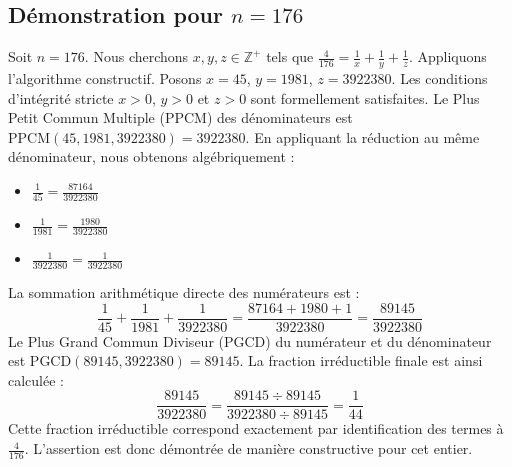 \documentclass[11pt,a4paper]{article}
\begin{document}
\subsection{Démonstration pour $n = 176$}
Soit $n = 176$. Nous cherchons $x, y, z \in \mathbb{Z}^{+}$ tels que $\frac{4}{176} = \frac{1}{x} + \frac{1}{y} + \frac{1}{z}$.
Appliquons l'algorithme constructif. Posons $x = 45$, $y = 1981$, $z = 3922380$.
Les conditions d'intégrité stricte $x > 0$, $y > 0$ et $z > 0$ sont formellement satisfaites.
Le Plus Petit Commun Multiple (PPCM) des dénominateurs est $\text{PPCM}(45, 1981, 3922380) = 3922380$.
En appliquant la réduction au même dénominateur, nous obtenons algébriquement :
\begin{itemize}
    \item $\frac{1}{45} = \frac{87164}{3922380}$
    \item $\frac{1}{1981} = \frac{1980}{3922380}$
    \item $\frac{1}{3922380} = \frac{1}{3922380}$
\end{itemize}
La sommation arithmétique directe des numérateurs est :
$$ \frac{1}{45} + \frac{1}{1981} + \frac{1}{3922380} = \frac{87164 + 1980 + 1}{3922380} = \frac{89145}{3922380} $$
Le Plus Grand Commun Diviseur (PGCD) du numérateur et du dénominateur est $\text{PGCD}(89145, 3922380) = 89145$.
La fraction irréductible finale est ainsi calculée :
$$ \frac{89145}{3922380} = \frac{89145 \div 89145}{3922380 \div 89145} = \frac{1}{44} $$
Cette fraction irréductible correspond exactement par identification des termes à $\frac{4}{176}$. L'assertion est donc démontrée de manière constructive pour cet entier.
\end{document}
